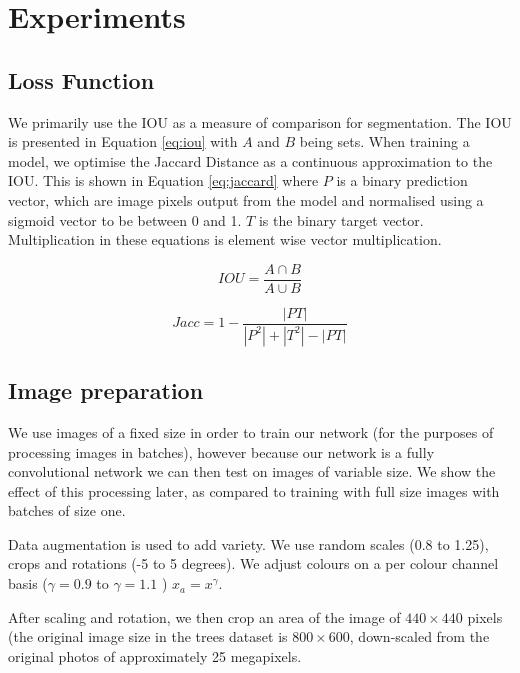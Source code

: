 \section {Experiments}


\subsection {Loss Function}


We primarily use the \gls{IOU} as a measure of comparison for segmentation. The \gls{IOU} is presented in Equation \ref{eq:iou} with $ A $ and $ B $ being sets. When training a model, we optimise the Jaccard Distance as a continuous approximation to the \gls{IOU}. This is shown in Equation \ref{eq:jaccard} where $ P $ is a binary prediction vector, which are image pixels output from the model and normalised using a sigmoid vector to be between 0 and 1. $ T $ is the binary target vector. Multiplication in these equations is element wise vector multiplication.


\begin{equation}
IOU = \frac{A \cap B}{A \cup B}
\label{eq:iou}
\end{equation}


\begin{equation}
Jacc = 1 - \frac{| PT |}{| P^2 | + | T^2 | - | PT |}
\label{eq:jaccard}
\end{equation}



\subsection {Image preparation}

We use images of a fixed size in order to train our network (for the purposes of processing images in batches), however because our network is a fully convolutional network we can then test on images of variable size. We show the effect of this processing later, as compared to training with full size images with batches of size one.

Data augmentation is used to add variety. We use random scales (0.8 to 1.25), crops and rotations (-5 to 5 degrees). We adjust colours on a per colour channel basis ($ \gamma = 0.9 $ to $ \gamma=1.1 $ )  $ x_a = x^{\gamma} $.

After scaling and rotation, we then crop an area of the image of $440 \times 440$ pixels (the original image size in the trees dataset is $800 \times 600$, down-scaled from the original photos of approximately 25 megapixels.

